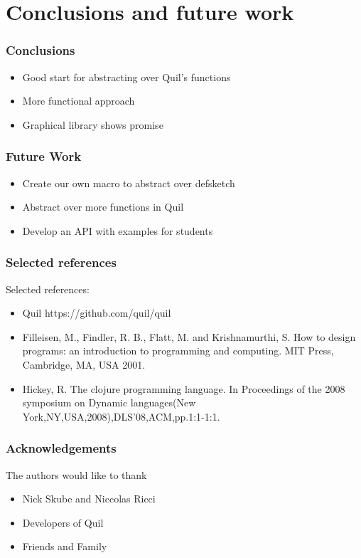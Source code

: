 \documentclass{beamer}
\begin{document}
\section{Conclusions and future work}

\begin{frame}
\frametitle{Conclusions}
\begin{itemize}
\item Good start for abstracting over Quil's functions
\item More functional approach
\item Graphical library shows promise
\end{itemize}
\end{frame}

\begin{frame}
\frametitle{Future Work}
\begin{itemize}
\item Create our own macro to abstract over defsketch
\item Abstract over more functions in Quil
\item Develop an API with examples for students
\end{itemize}
\end{frame}

\begin{frame}
\frametitle{Selected references}
Selected references:
\begin{itemize}
\item Quil https://github.com/quil/quil
\item Filleisen, M., Findler, R. B., Flatt, M. and Krishnamurthi, S. How to design programs: an introduction to programming and computing. MIT Press, Cambridge, MA, USA 2001.
\item Hickey, R. The clojure programming language. In Proceedings of the 2008 symposium on Dynamic languages(New York,NY,USA,2008),DLS'08,ACM,pp.1:1-1:1.
\end{itemize}
\end{frame}

\begin{frame}
\frametitle{Acknowledgements}
The authors would like to thank
\begin{itemize}
\item Nick Skube and Niccolas Ricci
\item Developers of Quil
\item Friends and Family
\end{itemize}
\end{frame}
\end{document}

